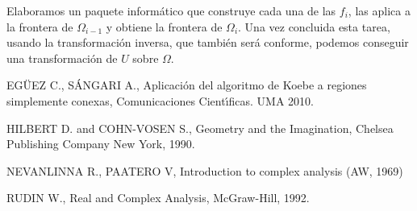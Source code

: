 \documentclass[a4paper,spanish]{article}
\begin{document}
Elaboramos un paquete inform\'{a}tico que construye cada una de las $f_{i}$,
las aplica a la frontera de $\Omega _{i-1}$ y obtiene la frontera de $\Omega
_{i}$. Una vez concluida esta tarea, usando la transformaci\'{o}n inversa,
que tambi\'{e}n ser\'{a} conforme, podemos conseguir una transformaci\'{o}n
de $U$ sobre $\Omega $.

\begin{thebibliography}{9}
 EG\"{U}EZ C., S\'{A}NGARI A., Aplicaci\'{o}n del algoritmo de
Koebe a regiones simplemente conexas, Comunicaciones Cient\'{\i}ficas. UMA
2010.

 HILBERT D. and COHN-VOSEN S., Geometry and the Imagination,
Chelsea Publishing Company New York, 1990.

 NEVANLINNA R., PAATERO V, Introduction to complex analysis (AW,
1969)

 RUDIN W., Real and Complex Analysis, McGraw-Hill, 1992.
\end{thebibliography}
\end{document}
